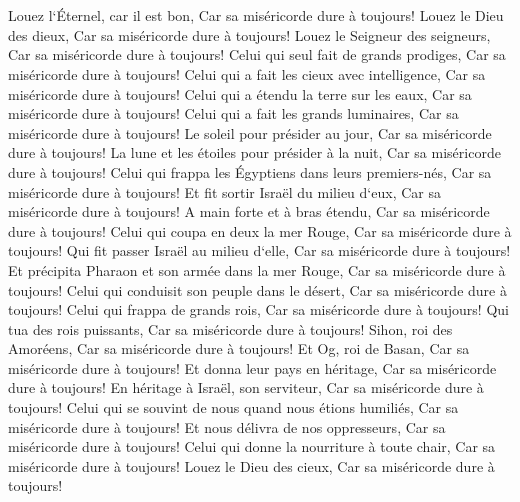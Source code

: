 \chapter{}

\verse Louez l`Éternel, car il est bon, Car sa miséricorde dure à toujours! 
\verse Louez le Dieu des dieux, Car sa miséricorde dure à toujours! 
\verse Louez le Seigneur des seigneurs, Car sa miséricorde dure à toujours! 
\verse Celui qui seul fait de grands prodiges, Car sa miséricorde dure à toujours! 
\verse Celui qui a fait les cieux avec intelligence, Car sa miséricorde dure à toujours! 
\verse Celui qui a étendu la terre sur les eaux, Car sa miséricorde dure à toujours! 
\verse Celui qui a fait les grands luminaires, Car sa miséricorde dure à toujours! 
\verse Le soleil pour présider au jour, Car sa miséricorde dure à toujours! 
\verse La lune et les étoiles pour présider à la nuit, Car sa miséricorde dure à toujours! 
\verse Celui qui frappa les Égyptiens dans leurs premiers-nés, Car sa miséricorde dure à toujours! 
\verse Et fit sortir Israël du milieu d`eux, Car sa miséricorde dure à toujours! 
\verse A main forte et à bras étendu, Car sa miséricorde dure à toujours! 
\verse Celui qui coupa en deux la mer Rouge, Car sa miséricorde dure à toujours! 
\verse Qui fit passer Israël au milieu d`elle, Car sa miséricorde dure à toujours! 
\verse Et précipita Pharaon et son armée dans la mer Rouge, Car sa miséricorde dure à toujours! 
\verse Celui qui conduisit son peuple dans le désert, Car sa miséricorde dure à toujours! 
\verse Celui qui frappa de grands rois, Car sa miséricorde dure à toujours! 
\verse Qui tua des rois puissants, Car sa miséricorde dure à toujours! 
\verse Sihon, roi des Amoréens, Car sa miséricorde dure à toujours! 
\verse Et Og, roi de Basan, Car sa miséricorde dure à toujours! 
\verse Et donna leur pays en héritage, Car sa miséricorde dure à toujours! 
\verse En héritage à Israël, son serviteur, Car sa miséricorde dure à toujours! 
\verse Celui qui se souvint de nous quand nous étions humiliés, Car sa miséricorde dure à toujours! 
\verse Et nous délivra de nos oppresseurs, Car sa miséricorde dure à toujours! 
\verse Celui qui donne la nourriture à toute chair, Car sa miséricorde dure à toujours! 
\verse Louez le Dieu des cieux, Car sa miséricorde dure à toujours! 

\chapter{}

